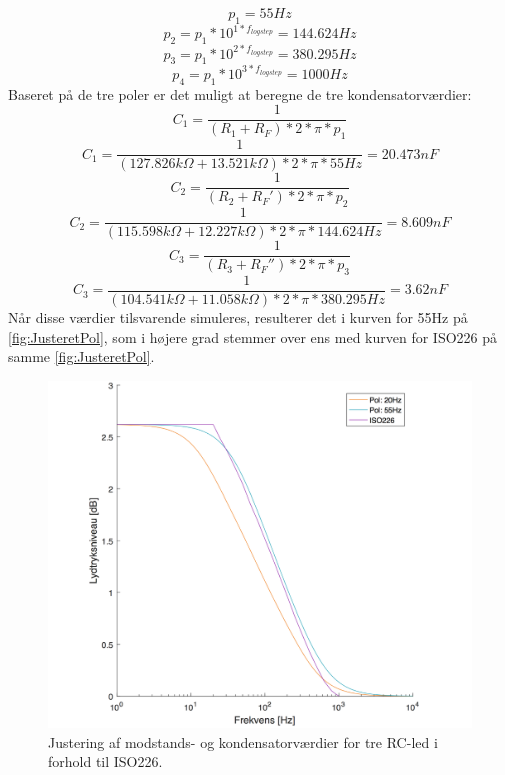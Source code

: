%
\begin{equation}
	p_1 = 55Hz
\end{equation}
%
\begin{equation}
	p_2 = p_1*10^{1*f_{logstep}} = 144.624Hz
\end{equation}
%
\begin{equation}
	p_3 = p_1*10^{2*f_{logstep}} = 380.295Hz
\end{equation}
%
\begin{equation}
	p_4 = p_1*10^{3*f_{logstep}} = 1000Hz
\end{equation}
%
Baseret på de tre poler er det muligt at beregne de tre kondensatorværdier:
%
\begin{equation}
	C_1 = \frac{1}{(R_1+R_F)*2*\pi*p_1} 
\end{equation}
%
\begin{equation}
	C_1 = \frac{1}{(127.826k\Omega+13.521k\Omega)*2*\pi*55Hz} = 20.473nF
\end{equation}
%
\begin{equation}
	C_2 = \frac{1}{(R_2+R_F')*2*\pi*p_2} 
\end{equation}
%
\begin{equation}
	C_2 = \frac{1}{(115.598k\Omega+12.227k\Omega)*2*\pi*144.624Hz} = 8.609nF
\end{equation}
\begin{equation}
	C_3 = \frac{1}{(R_3+R_F'')*2*\pi*p_3} 
\end{equation}
%
\begin{equation}
	C_3 = \frac{1}{(104.541k\Omega+11.058k\Omega)*2*\pi*380.295Hz} = 3.62nF
\end{equation}
%
Når disse værdier tilsvarende simuleres, resulterer det i kurven for 55Hz på \autoref{fig:JusteretPol}, som i højere grad stemmer over ens med kurven for ISO226 på samme \autoref{fig:JusteretPol}.
%
\begin{figure}[H]
	\centering
	\includegraphics[resolution=300,width=\textwidth]{Figure/DesignAfFilter/JusteretPolSHORT.pdf}
	\caption{Justering af modstands- og kondensatorværdier for tre RC-led i forhold til ISO226.}
	\label{fig:JusteretPol}
\end{figure}
